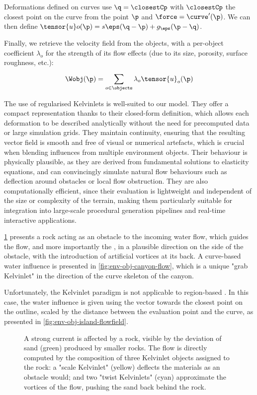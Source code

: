 Deformations defined on curves use $\q = \closestCp$ with $\closestCp$ the closest point on the curve from the point $\p$ and $\force = \curve'(\p)$. We can then define $\tensor{u}o(\p) = s\eps(\q - \p) + g_\eps(\p - \q)$.

Finally, we retrieve the velocity field from the objects, with a per-object coefficient $\lambda_o$ for the strength of its flow effects (due to its size, porosity, surface roughness, etc.):
\begin{align}
    \Wobj(\p) = \sum_{o \in \objects}^{}{\lambda_o \tensor{u}_o(\p)}
\end{align}

The use of regularised Kelvinlets is well-suited to our model. They offer a compact representation thanks to their closed-form definition, which allows each deformation to be described analytically without the need for precomputed data or large simulation grids. They maintain continuity, ensuring that the resulting vector field is smooth and free of visual or numerical artefacts, which is crucial when blending influences from multiple environment objects. Their behaviour is physically plausible, as they are derived from fundamental solutions to elasticity equations, and can convincingly simulate natural flow behaviours such as deflection around obstacles or local flow obstruction. They are also computationally efficient, since their evaluation is lightweight and independent of the size or complexity of the terrain, making them particularly suitable for integration into large-scale procedural generation pipelines and real-time interactive applications.

\cref{fig:env-obj-rock-with-kelvinlets} presents a rock acting as an obstacle to the incoming water flow, which guides the flow, and more importantly the , in a plausible direction on the side of the obstacle, with the introduction of artificial vortices at its back. A curve-based water influence is presented in \cref{fig:env-obj-canyon-flow}, which is a unique "grab Kelvinlet" in the direction of the curve skeleton of the canyon.

Unfortunately, the Kelvinlet paradigm is not applicable to region-based . In this case, the water influence is given using the vector towards the closest point on the outline, scaled by the distance between the evaluation point and the curve, as presented in \cref{fig:env-obj-island-flowfield}.

\begin{figure}
\caption{A strong current is affected by a rock, visible by the deviation of sand (green) produced by smaller rocks. The flow is directly computed by the composition of three Kelvinlet objects assigned to the rock: a "scale Kelvinlet" (yellow) deflects the materials as an obstacle would; and two "twist Kelvinlets" (cyan) approximate the vortices of the flow, pushing the sand back behind the rock.}
\label{fig:env-obj-rock-with-kelvinlets}
\end{figure}

